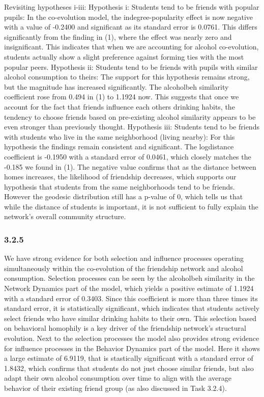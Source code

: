 \documentclass[
]{article}
\begin{document}
Revisiting hypotheses i-iii: Hypothesis i: Students tend to be friends
with popular pupils: In the co-evolution model, the indegree-popularity
effect is now negative with a value of -0.2400 and significant as its
standard error is 0.0761. This differs significantly from the finding in
(1), where the effect was nearly zero and insignificant. This indicates
that when we are accounting for alcohol co-evolution, students actually
show a slight preference against forming ties with the most popular
peers. Hypothesis ii: Students tend to be friends with pupils with
similar alcohol consumption to theirs: The support for this hypothesis
remains strong, but the magnitude has increased significantly. The
alcoholbeh similarity coefficient rose from 0.494 in (1) to 1.1924 now.
This suggests that once we account for the fact that friends influence
each others drinking habits, the tendency to choose friends based on
pre-existing alcohol similarity appears to be even stronger than
previously thought. Hypothesis iii: Students tend to be friends with
students who live in the same neighborhood (living nearby): For this
hypothesis the findings remain consistent and significant. The
logdistance coefficient is -0.1950 with a standard error of 0.0461,
which closely matches the -0.185 we found in (1). The negative value
confirms that as the distance between homes increases, the likelihood of
friendship decreases, which supports our hypothesis that students from
the same neighborhoods tend to be friends. However the geodesic
distribution still has a p-value of 0, which tells us that while the
distance of students is important, it is not sufficient to fully explain
the network's overall community structure.

\subsubsection{3.2.5}\label{section-20}

We have strong evidence for both selection and influence processes
operating simultaneously within the co-evolution of the friendship
network and alcohol consumption. Selection processes can be seen by the
alcoholbeh similarity in the Network Dynamics part of the model, which
yields a positive estimate of 1.1924 with a standard error of 0.3403.
Since this coefficient is more than three times its standard error, it
is statistically significant, which indicates that students actively
select friends who have similar drinking habits to their own. This
selection based on behavioral homophily is a key driver of the
friendship network's structural evolution. Next to the selection
processes the model also provides strong evidence for influence
processes in the Behavior Dynamics part of the model. Here it shows a
large estimate of 6.9119, that is stastically significant with a
standard error of 1.8432, which confirms that students do not just
choose similar friends, but also adapt their own alcohol consumption
over time to align with the average behavior of their existing friend
group (as also discussed in Task 3.2.4).
\end{document}
